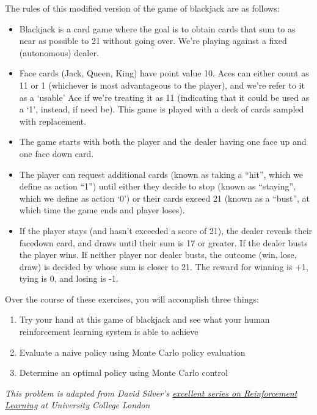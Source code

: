 \documentclass[
  letterpaper,
  DIV=11,
  numbers=noendperiod]{scrartcl}
\providecommand{\tightlist}{%
  \setlength{\itemsep}{0pt}\setlength{\parskip}{0pt}}\usepackage{longtable,booktabs,array}
\begin{document}
The rules of this modified version of the game of blackjack are as
follows:

\begin{itemize}
\tightlist
\item
  Blackjack is a card game where the goal is to obtain cards that sum to
  as near as possible to 21 without going over. We're playing against a
  fixed (autonomous) dealer.
\item
  Face cards (Jack, Queen, King) have point value 10. Aces can either
  count as 11 or 1 (whichever is most advantageous to the player), and
  we're refer to it as a `usable' Ace if we're treating it as 11
  (indicating that it could be used as a `1', instead, if need be). This
  game is played with a deck of cards sampled with replacement.
\item
  The game starts with both the player and the dealer having one face up
  and one face down card.
\item
  The player can request additional cards (known as taking a ``hit'',
  which we define as action ``1'') until either they decide to stop
  (known as ``staying'', which we define as action `0') or their cards
  exceed 21 (known as a ``bust'', at which time the game ends and player
  loses).
\item
  If the player stays (and hasn't exceeded a score of 21), the dealer
  reveals their facedown card, and draws until their sum is 17 or
  greater. If the dealer busts the player wins. If neither player nor
  dealer busts, the outcome (win, lose, draw) is decided by whose sum is
  closer to 21. The reward for winning is +1, tying is 0, and losing is
  -1.
\end{itemize}

Over the course of these exercises, you will accomplish three things:

\begin{enumerate}
\def\labelenumi{\arabic{enumi}.}
\tightlist
\item
  Try your hand at this game of blackjack and see what your human
  reinforcement learning system is able to achieve
\item
  Evaluate a naive policy using Monte Carlo policy evaluation
\item
  Determine an optimal policy using Monte Carlo control
\end{enumerate}

\emph{This problem is adapted from David Silver's
\href{http://www0.cs.ucl.ac.uk/staff/d.silver/web/Teaching.html}{excellent
series on Reinforcement Learning} at University College London}
\end{document}
